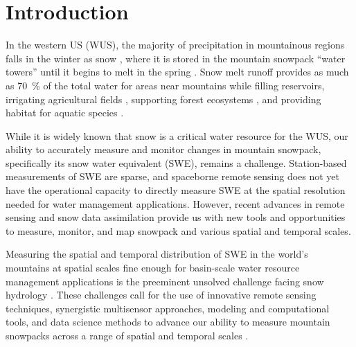 
\hypertarget{ch1}{%
\chapter{Introduction}\label{ch1}}


In the western US (WUS), the majority of precipitation in mountainous regions falls in the winter as snow \citep{serrezeCharacteristicsWesternUnited1999}, where it is stored in the mountain snowpack ``water towers” until it begins to melt in the spring \citep{immerzeelImportanceVulnerabilityWorld2020,viviroliIncreasingDependenceLowland2020}. Snow melt runoff provides as much as 70~\% of the total water for areas near mountains \citep{liHowMuchRunoff2017} while filling reservoirs, irrigating agricultural fields \citep{qinSnowmeltRiskTelecouplings2022a}, supporting forest ecosystems \citep{varholaForestCanopyEffects2010}, and providing habitat for aquatic species \citep{yarnellEcologyManagementSpring2010}. 

While it is widely known that snow is a critical water resource for the WUS, our ability to accurately measure and monitor changes in mountain snowpack, specifically its snow water equivalent (SWE), remains a challenge. Station-based measurements of SWE are sparse, and spaceborne remote sensing does not yet have the operational capacity to directly measure SWE at the spatial resolution needed for water management applications. However, recent advances in remote sensing \citep{lievensSnowDepthVariability2019,tarriconeEstimatingSnowAccumulation2023a, tsangReviewArticleGlobal2022} and snow data assimilation \citep{margulisLandsatEraSierraNevada2016} provide us with new tools and opportunities to measure, monitor, and map snowpack and various spatial and temporal scales.

Measuring the spatial and temporal distribution of SWE in the world’s mountains at spatial scales fine enough for basin-scale water resource management applications is the preeminent unsolved challenge facing snow hydrology \citep{lettenmaierInroadsRemoteSensing2015, dozierEstimatingSpatialDistribution2016}. These challenges call for the use of innovative remote sensing techniques, synergistic multisensor approaches, modeling and computational tools, and data science methods to advance our ability to measure mountain snowpacks across a range of spatial and temporal scales \citep{dozierMountainHydrologySnow2011}. 

